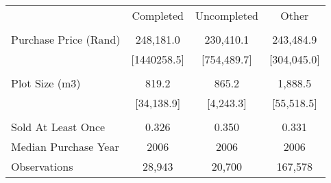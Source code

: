 \begin{tabu}{lccc}
 & Completed & Uncompleted & Other  \\
 &  &  &  \\ 
 Purchase Price (Rand)  & 248,181.0  & 230,410.1  & 243,484.9  \\ 
\rowfont{\footnotesize} & [1440258.5]  & [754,489.7]  & [304,045.0]  \\ 
 &  &  &  \\ 
 Plot Size (m3)  & 819.2  & 865.2  & 1,888.5  \\ 
\rowfont{\footnotesize} & [34,138.9]  & [4,243.3]  & [55,518.5]  \\ 
 &  &  &  \\ 
 Sold At Least Once  & 0.326  & 0.350  & 0.331  \\ 
 Median Purchase Year  & 2006  & 2006  & 2006  \\ 
\midrule
 Observations  & 28,943  & 20,700  & 167,578  \\ 
\bottomrule
\end{tabu}
